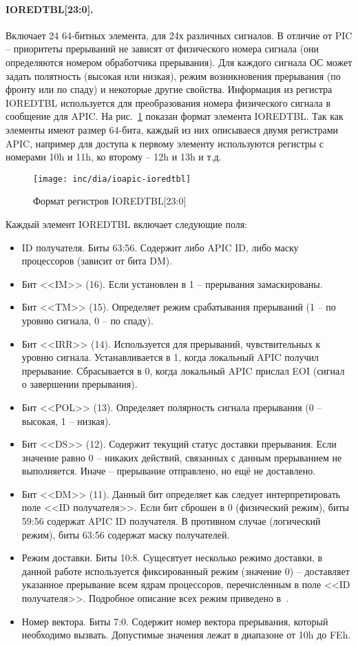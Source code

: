\paragraph{IOREDTBL[23:0].} Включает 24 64-битных элемента, для 24х различных сигналов. В отличие от PIC -- приоритеты
прерываний не зависят от физического номера сигнала (они определяются номером обработчика прерывания). Для каждого
сигнала ОС может задать полятность (высокая или низкая), режим возникновения прерывания (по фронту или по спаду) и некоторые
другие свойства. Информация из регистра IOREDTBL используется для преобразования номера физического сигнала в сообщение для
APIC. На рис.~\ref{fig:ioapic-ioredtbl} показан формат элемента IOREDTBL. Так как элементы имеют размер 64-бита, каждый
из них описываеся двумя регистрами APIC, например для доступа к первому элементу используются регистры с номерами 10h и 11h,
ко второму -- 12h и 13h и т.д.

\begin{figure}[ht!]
  \centering
  \texttt{[image: inc/dia/ioapic-ioredtbl]}
  \caption{Формат регистров IOREDTBL[23:0]}
  \label{fig:ioapic-ioredtbl}
\end{figure}

Каждый элемент IOREDTBL включает следующие поля:
\begin{itemize}
\item ID получателя. Биты 63:56. Содержит либо APIC ID, либо маску процессоров (зависит от бита DM).
\item Бит <<IM>> (16). Если установлен в 1 -- прерывания замаскированы.
\item Бит <<TM>> (15). Определяет режим срабатывания прерываний (1 -- по уровню сигнала, 0 -- по спаду).
\item Бит <<IRR>> (14). Используется для прерываний, чувствительных к уровню сигнала. Устанавливается в 1,
	когда локальный APIC получил прерывание. Сбрасывается в 0, когда локальный APIC прислал EOI (сигнал
	о завершении прерывания).
\item Бит <<POL>> (13). Определяет полярность сигнала прерывания (0 -- высокая, 1 -- низкая).
\item Бит <<DS>> (12). Содержит текущий статус доставки прерывания. Если значение равно 0 -- никаких действий,
	связанных с данным прерыванием не выполняется. Иначе -- прерывание отправлено, но ещё не доставлено.
\item Бит <<DM>> (11). Данный бит определяет как следует интерпретировать поле <<ID получателя>>.
	Если бит сброшен в 0 (физический режим), биты 59:56 содержат APIC ID получателя. В
	противном случае (логический режим), биты 63:56 содержат маску получателей.
\item Режим доставки. Биты 10:8. Сущесвтует несколько режимо доставки, в данной работе используется
	фиксированный режим (значение 0) -- доставляет указанное прерывание всем ядрам процессоров,
	перечисленным в поле <<ID получателя>>. Подробное описание всех режим приведено в~\cite{ioapic}.
\item Номер вектора. Биты 7:0. Содержит номер вектора прерывания, который необходимо вызвать.
	Допустимые значения лежат в диапазоне от 10h до FEh.
\end{itemize}
